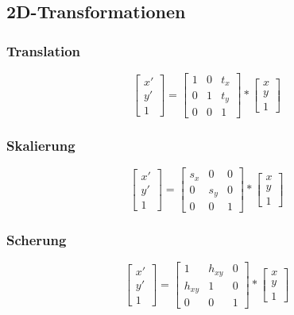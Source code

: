 \documentclass[10pt]{article}
\begin{document}
\subsection{2D-Transformationen}
\subsubsection{Translation}
\begin{equation}
\begin{bmatrix} x' \\ y' \\ 1\end{bmatrix}
= \begin{bmatrix}
1 & 0 & t_x \\
0 & 1 & t_y \\
0 & 0 & 1
\end{bmatrix} * \begin{bmatrix} x \\ y \\ 1\end{bmatrix}
\end{equation}
\subsubsection{Skalierung}
\begin{equation}
\begin{bmatrix} x' \\ y' \\ 1\end{bmatrix}
= \begin{bmatrix}
s_x & 0 & 0\\
0 & s_y & 0 \\
0 & 0 & 1
\end{bmatrix} * \begin{bmatrix} x \\ y \\ 1\end{bmatrix}
\end{equation}
\subsubsection{Scherung}
\begin{equation}
\begin{bmatrix} x' \\ y' \\ 1\end{bmatrix}
= \begin{bmatrix}
1 & h_{xy} & 0\\
h_{xy} & 1 & 0\\
0 & 0 & 1
\end{bmatrix} * \begin{bmatrix} x \\ y \\ 1\end{bmatrix}
\end{equation}
\end{document}
